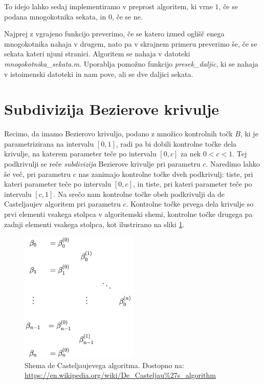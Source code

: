 \documentclass[a4paper, 12pt]{article} %
\begin{document}
To idejo lahko sedaj implementiramo v preprost algoritem, ki vrne $1$, če se podana mnogokotnika sekata, in $0$, če se ne.

Najprej z vgrajeno funkcijo preverimo, če se katero izmed oglišč enega mnogokotnika nahaja v drugem, nato pa v skrajnem primeru preverimo še, če se sekata kateri njuni stranici. Algoritem se nahaja v datoteki \emph{mnogokotnika\_sekata.m}. Uporablja pomožno funkcijo \emph{presek\_daljic}, ki se nahaja v istoimenski datoteki in nam pove, ali se dve daljici sekata.

\section{Subdivizija Bezierove krivulje}

Recimo, da imamo Bezierovo krivuljo, podano z množico kontrolnih točk $B$, ki je parametrizirana na intervalu $[0, 1]$, radi pa bi dobili kontrolne točke dela krivulje, na katerem parameter teče po intervalu $[0, c]$ za nek $0 < c < 1$. Tej podkrivulji se reče \emph{subdivizija} Bezierove krivulje pri parametru $c$. Naredimo lahko še več, pri parametru $c$ nas zanimajo kontrolne točke dveh podkrivulj: tiste, pri kateri parameter teče po intervalu $[0, c]$, in tiste, pri kateri parameter teče po intervalu $[c, 1]$. Na srečo nam kontrolne točke obeh podkrivulji da de Casteljaujev algoritem pri parametru $c$. Kontrolne točke prvega dela krivulje so prvi elementi vsakega stolpca v algoritemski shemi, kontrolne točke drugega pa zadnji elementi vsakega stolpca, kot ilustrirano na sliki \ref{fig:decastshema}.

\begin{figure}[h]
\centering
\includegraphics[scale=0.6]{deCasteljau}
\caption{Shema de Casteljaujevega algoritma. Dostopno na: \url{https://en.wikipedia.org/wiki/De_Casteljau\%27s\_algorithm}}
\label{fig:decastshema}
\end{figure}
\end{document}
